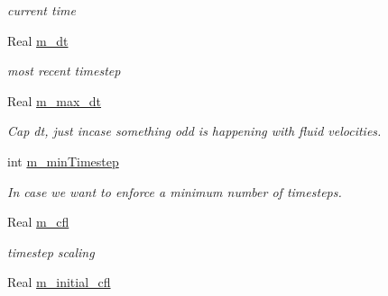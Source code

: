 \begin{DoxyCompactItemize}
\begin{DoxyCompactList}\small\item\em current time \end{DoxyCompactList}\item 
\hypertarget{classamr_mushy_layer_ae6469630ae686c3e824d7d8208fa052b}{Real \hyperlink{classamr_mushy_layer_ae6469630ae686c3e824d7d8208fa052b}{m\-\_\-dt}}\label{classamr_mushy_layer_ae6469630ae686c3e824d7d8208fa052b}

\begin{DoxyCompactList}\small\item\em most recent timestep \end{DoxyCompactList}\item 
\hypertarget{classamr_mushy_layer_a1b6cbcee09d4e25fce79303fff7711f4}{Real \hyperlink{classamr_mushy_layer_a1b6cbcee09d4e25fce79303fff7711f4}{m\-\_\-max\-\_\-dt}}\label{classamr_mushy_layer_a1b6cbcee09d4e25fce79303fff7711f4}

\begin{DoxyCompactList}\small\item\em Cap dt, just incase something odd is happening with fluid velocities. \end{DoxyCompactList}\item 
\hypertarget{classamr_mushy_layer_ac61f8e0e20cf368012804a3c4c77cb61}{int \hyperlink{classamr_mushy_layer_ac61f8e0e20cf368012804a3c4c77cb61}{m\-\_\-min\-Timestep}}\label{classamr_mushy_layer_ac61f8e0e20cf368012804a3c4c77cb61}

\begin{DoxyCompactList}\small\item\em In case we want to enforce a minimum number of timesteps. \end{DoxyCompactList}\item 
\hypertarget{classamr_mushy_layer_aacdfaa40080f4cb3e537b4ccd37ef740}{Real \hyperlink{classamr_mushy_layer_aacdfaa40080f4cb3e537b4ccd37ef740}{m\-\_\-cfl}}\label{classamr_mushy_layer_aacdfaa40080f4cb3e537b4ccd37ef740}

\begin{DoxyCompactList}\small\item\em timestep scaling \end{DoxyCompactList}\item 
\hypertarget{classamr_mushy_layer_a130bc2b5f7f063889f113df1b5f9796a}{Real \hyperlink{classamr_mushy_layer_a130bc2b5f7f063889f113df1b5f9796a}{m\-\_\-initial\-\_\-cfl}}\label{classamr_mushy_layer_a130bc2b5f7f063889f113df1b5f9796a}


\end{DoxyCompactItemize}
